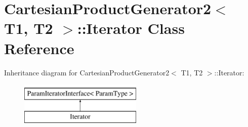 \hypertarget{classtesting_1_1internal_1_1CartesianProductGenerator2_1_1Iterator}{\section{\-Cartesian\-Product\-Generator2$<$ \-T1, \-T2 $>$\-:\-:\-Iterator \-Class \-Reference}
\label{df/d16/classtesting_1_1internal_1_1CartesianProductGenerator2_1_1Iterator}
}
\-Inheritance diagram for \-Cartesian\-Product\-Generator2$<$ \-T1, \-T2 $>$\-:\-:\-Iterator\-:\begin{figure}[H]
\begin{center}
\leavevmode
\includegraphics[height=2.000000cm]{df/d16/classtesting_1_1internal_1_1CartesianProductGenerator2_1_1Iterator}
\end{center}
\end{figure}

